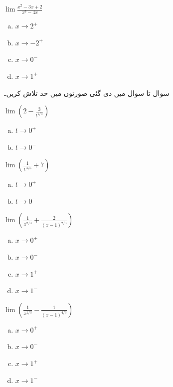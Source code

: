 $\lim\tfrac{x^2-3x+2}{x^3-4x}$
\begin{multicols}{4}
\begin{enumerate}[a.]
\item
$x\to 2^+$
\item
$x\to -2^+$
\item
$x\to 0^-$
\item
$x\to 1^+$
\end{enumerate}
\end{multicols}
سوال  تا سوال  میں دی گئی صورتوں میں حد تلاش کریں۔

$\lim(2-\tfrac{3}{t^{1/3}})$
\begin{multicols}{4}
\begin{enumerate}[a.]
\item
$t\to 0^+$
\item
$t\to 0^-$
\end{enumerate}
\end{multicols}
$\lim(\tfrac{1}{t^{\,3/5}}+7)$
\begin{multicols}{4}
\begin{enumerate}[a.]
\item
$t\to 0^+$
\item
$t\to 0^-$
\end{enumerate}
\end{multicols}
$\lim(\tfrac{1}{x^{2/3}}+\tfrac{2}{(x-1)^{2/3}})$
\begin{multicols}{4}
\begin{enumerate}[a.]
\item
$x\to 0^+$
\item
$x\to 0^-$
\item
$x\to 1^+$
\item
$x\to 1^-$
\end{enumerate}
\end{multicols}
$\lim(\tfrac{1}{x^{1/3}}-\tfrac{1}{(x-1)^{4/3}})$
\begin{multicols}{4}
\begin{enumerate}[a.]
\item
$x\to 0^+$
\item
$x\to 0^-$
\item
$x\to 1^+$
\item
$x\to 1^-$
\end{enumerate}
\end{multicols}

